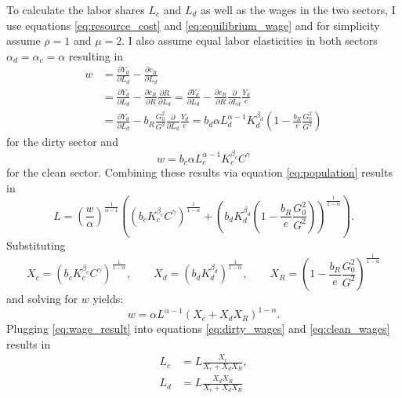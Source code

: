 To calculate the labor shares $L_c$ and $L_d$ as well as the wages in the two sectors, I use equations \eqref{eq:resource_cost} and \eqref{eq:equilibrium_wage} and for simplicity assume $\rho=1$ and $\mu=2$. I also assume equal labor elasticities in both sectors $\alpha_d = \alpha_c = \alpha$ resulting in
\begin{align}
	w &= \frac{\partial Y_d}{\partial L_d} - \frac{\partial c_R}{\partial L_d} \nonumber \\
	&= \frac{\partial Y_d}{\partial L_d} - \frac{\partial c_R}{\partial R} \frac{\partial R}{\partial L_d} \nonumber = \frac{\partial Y_d}{\partial L_d} - \frac{\partial c_R}{\partial R} \frac{\partial}{\partial L_d} \frac{Y_d}{e} \nonumber \\
	&= \frac{\partial Y_d}{\partial L_d} - b_R\frac{G_0^2}{G^2} \frac{\partial}{\partial L_d} \frac{Y_d}{e} = b_d \alpha L_d^{\alpha-1} K_d^{\beta_d}\left( 1-\frac{b_R}{e}\frac{G_0^2}{G^2} \right)
	\label{eq:dirty_wages}
\end{align}
for the dirty sector and
\begin{equation}
	w = b_c \alpha L_c^{\alpha-1} K_c^{\beta_c} C^{\gamma}
	\label{eq:clean_wages}
\end{equation}
for the clean sector. Combining these results via equation \eqref{eq:population} results in
\begin{equation}
	L = \left( \frac{w}{\alpha} \right)^{\frac{1}{\alpha-1}}\left( \left( b_c K_c^{\beta_c}C^{\gamma} \right)^{\frac{1}{1-\alpha}} + \left( b_d K_d^{\beta_d} \left( 1 - \frac{b_R}{e}\frac{G_0^2}{G^2} \right) \right)^{\frac{1}{1-\alpha}} \right).
\end{equation}
Substituting 
\begin{equation}
	X_c = (b_c K_c^{\beta_c}C^{\gamma})^{\frac{1}{1-\alpha}}, \qquad X_d = (b_d K_d^{\beta_d})^{\frac{1}{1-\alpha}}, \qquad X_R = \left( 1 - \frac{b_R}{e}\frac{G_0^2}{G^2} \right)^{\frac{1}{1-\alpha}}
	\label{eq:substitutions}
\end{equation}
and solving for $w$ yields:
\begin{equation}
	w = \alpha L^{\alpha-1}\left( X_c + X_d X_R \right)^{1-\alpha}.
	\label{eq:wage_result}
\end{equation}
Plugging \eqref{eq:wage_result} into equations \eqref{eq:dirty_wages} and \eqref{eq:clean_wages} results in 
\begin{align}
	L_c &= L \frac{X_c}{X_c + X_d X_R}, \label{eq:clean_labor} \\
	L_d &= L \frac{X_d X_R}{X_c + X_d X_R} \label{eq:dirty_labor}
\end{align}
